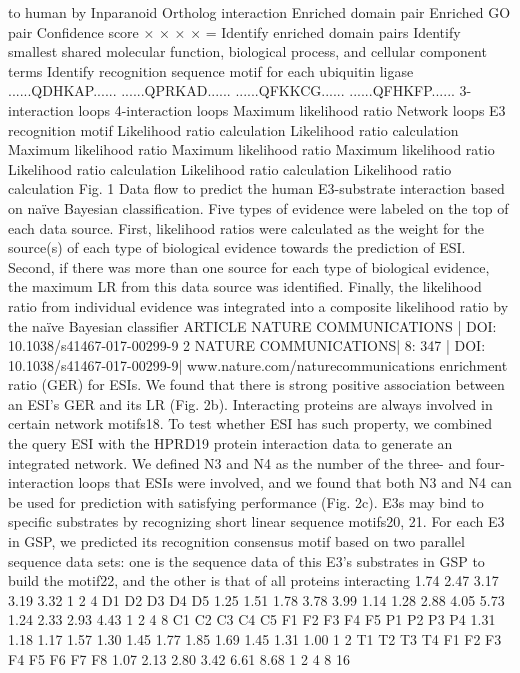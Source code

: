 to human by Inparanoid
Ortholog interaction
Enriched domain pair
Enriched GO pair
Confidence score
×
×
×
×
=
Identify enriched
domain pairs
Identify smallest shared
molecular function,
biological process, and
cellular component terms
Identify recognition
sequence motif for
each ubiquitin ligase
......QDHKAP......
......QPRKAD......
......QFKKCG......
......QFHKFP......
3-interaction
loops
4-interaction
loops
Maximum likelihood ratio
Network loops
E3 recognition motif
Likelihood ratio calculation
Likelihood ratio calculation
Maximum likelihood ratio
Maximum likelihood ratio
Maximum likelihood ratio
Likelihood ratio calculation
Likelihood ratio calculation
Likelihood ratio calculation
Fig. 1 Data ﬂow to predict the human E3-substrate interaction based on naïve Bayesian classiﬁcation. Five types of evidence were labeled on the top of each
data source. First, likelihood ratios were calculated as the weight for the source(s) of each type of biological evidence towards the prediction of ESI. Second,
if there was more than one source for each type of biological evidence, the maximum LR from this data source was identiﬁed. Finally, the likelihood ratio
from individual evidence was integrated into a composite likelihood ratio by the naïve Bayesian classiﬁer
ARTICLE
NATURE COMMUNICATIONS | DOI: 10.1038/s41467-017-00299-9
2
NATURE COMMUNICATIONS| 8:  347
| DOI: 10.1038/s41467-017-00299-9| www.nature.com/naturecommunications
enrichment ratio (GER) for ESIs. We found that there is strong
positive association between an ESI’s GER and its LR (Fig. 2b).
Interacting proteins are always involved in certain network
motifs18. To test whether ESI has such property, we combined the
query ESI with the HPRD19 protein interaction data to generate
an integrated network. We deﬁned N3 and N4 as the number of
the three- and four-interaction loops that ESIs were involved, and
we found that both N3 and N4 can be used for prediction with
satisfying performance (Fig. 2c).
E3s may bind to speciﬁc substrates by recognizing short linear
sequence motifs20, 21. For each E3 in GSP, we predicted its
recognition consensus motif based on two parallel sequence data
sets: one is the sequence data of this E3’s substrates in GSP to
build the motif22, and the other is that of all proteins interacting
1.74
2.47
3.17
3.19
3.32
1
2
4
D1
D2
D3
D4
D5
1.25
1.51
1.78
3.78 3.99
1.14 1.28
2.88
4.05
5.73
1.24
2.33
2.93
4.43
1
2
4
8
C1 C2 C3 C4 C5
F1 F2 F3 F4 F5
P1 P2 P3 P4
1.31
1.18 1.17
1.57
1.30
1.45
1.77
1.85
1.69
1.45
1.31
1.00
1
2
T1
T2
T3
T4
F1
F2
F3
F4
F5
F6
F7
F8
1.07
2.13
2.80
3.42
6.61
8.68
1
2
4
8
16
